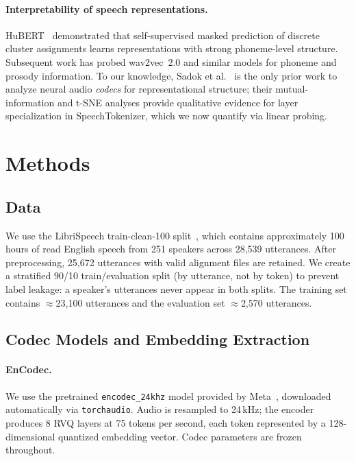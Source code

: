 \documentclass[10pt,twocolumn]{article}
\begin{document}
\paragraph{Interpretability of speech representations.}
HuBERT~\cite{hsu2021} demonstrated that self-supervised masked
prediction of discrete cluster assignments learns representations with
strong phoneme-level structure. Subsequent work has probed wav2vec~2.0
and similar models for phoneme and prosody information. To our
knowledge, Sadok et al.~\cite{sadok2025} is the only prior work to
analyze neural audio \emph{codecs} for representational structure;
their mutual-information and t-SNE analyses provide qualitative
evidence for layer specialization in SpeechTokenizer, which we now
quantify via linear probing.

\section{Methods}

\subsection{Data}

We use the LibriSpeech train-clean-100 split~\cite{panayotov2015},
which contains approximately 100 hours of read English speech from 251
speakers across 28,539 utterances. After preprocessing, 25,672
utterances with valid alignment files are retained. We create a
stratified 90/10 train/evaluation split (by utterance, not by token)
to prevent label leakage: a speaker's utterances never appear in both
splits. The training set contains $\approx$23,100 utterances and the
evaluation set $\approx$2,570 utterances.

\subsection{Codec Models and Embedding Extraction}

\paragraph{EnCodec.}
We use the pretrained \texttt{encodec\_24khz} model provided by
Meta~\cite{defossez2023}, downloaded automatically via \texttt{torchaudio}.
Audio is resampled to 24\,kHz; the encoder produces 8 RVQ layers at
75 tokens per second, each token represented by a 128-dimensional
quantized embedding vector. Codec parameters are frozen throughout.
\end{document}
